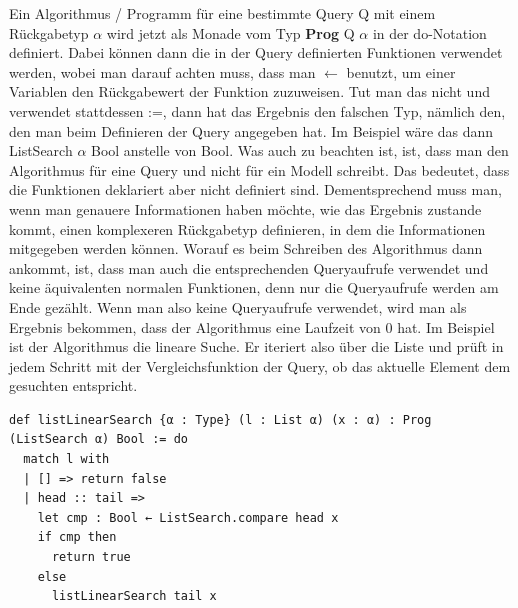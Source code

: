 Ein Algorithmus / Programm für eine bestimmte Query Q mit einem Rückgabetyp $\alpha$ wird jetzt als Monade vom Typ \textbf{Prog} Q $\alpha$ in der do-Notation definiert.
Dabei können dann die in der Query definierten Funktionen verwendet werden, wobei man darauf achten muss, dass man $\leftarrow$ benutzt, um einer Variablen den Rückgabewert der Funktion zuzuweisen.
Tut man das nicht und verwendet stattdessen :=, dann hat das Ergebnis den falschen Typ, nämlich den, den man beim Definieren der Query angegeben hat.
Im Beispiel wäre das dann ListSearch $\alpha$ Bool anstelle von Bool.
Was auch zu beachten ist, ist, dass man den Algorithmus für eine Query und nicht für ein Modell schreibt.
Das bedeutet, dass die Funktionen deklariert aber nicht definiert sind.
Dementsprechend muss man, wenn man genauere Informationen haben möchte, wie das Ergebnis zustande kommt, einen komplexeren Rückgabetyp definieren, in dem die Informationen mitgegeben werden können.
Worauf es beim Schreiben des Algorithmus dann ankommt, ist, dass man auch die entsprechenden Queryaufrufe verwendet und keine äquivalenten normalen Funktionen,
denn nur die Queryaufrufe werden am Ende gezählt.
Wenn man also keine Queryaufrufe verwendet, wird man als Ergebnis bekommen, dass der Algorithmus eine Laufzeit von 0 hat.
Im Beispiel ist der Algorithmus die lineare Suche.
Er iteriert also über die Liste und prüft in jedem Schritt mit der Vergleichsfunktion der Query, ob das aktuelle Element dem gesuchten entspricht.
\newpage
\begin{lstlisting}
def listLinearSearch {α : Type} (l : List α) (x : α) : Prog (ListSearch α) Bool := do
  match l with
  | [] => return false
  | head :: tail =>
    let cmp : Bool ← ListSearch.compare head x
    if cmp then
      return true
    else
      listLinearSearch tail x
\end{lstlisting}

